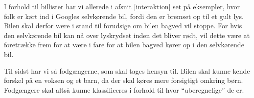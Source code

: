 I forhold til billister har vi allerede i afsnit \ref{interaktion} set på eksempler, hvor folk er kørt ind i Googles selvkørende bil, fordi den er bremset op til et gult lys. Bilen skal derfor være i stand til forudsige om bilen bagved vil stoppe. For hvis den selvkørende bil kan nå over lyskrydset inden det bliver rødt, vil dette være at foretrække frem for at være i fare for at bilen bagved kører op i den selvkørende bil.

Til sidst har vi så fodgængerne, som skal tages hensyn til. Bilen skal kunne kende forskel på en voksen og et barn, da der skal køres mere forsigtigt omkring børn. Fodgængere skal altså kunne klassificeres i forhold til hvor ``uberegnelige'' de er. 
